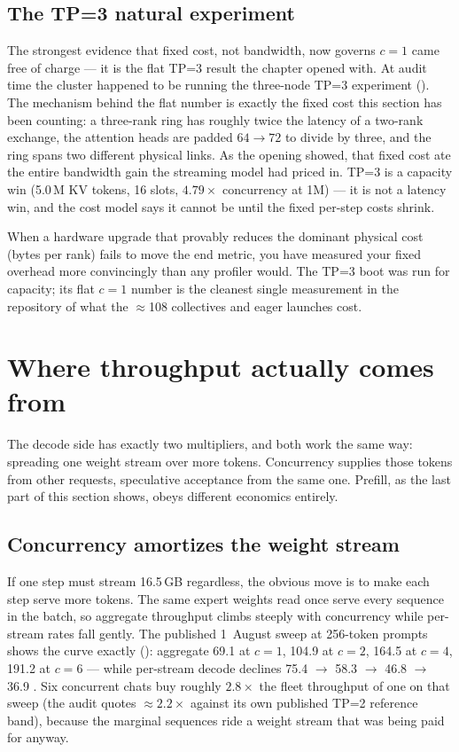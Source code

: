 \subsection{The TP=3 natural experiment}

The strongest evidence that fixed cost, not bandwidth, now governs $c=1$
came free of charge --- it is the flat TP=3 result the chapter opened with.
At audit time the cluster happened to be running the three-node TP=3
experiment (). The mechanism behind the flat number is
exactly the fixed cost this section has been counting: a three-rank ring has
roughly twice the latency of a two-rank exchange, the attention heads are
padded $64 \to 72$ to divide by three, and the ring spans two different
physical links. As the opening showed, that fixed cost ate the entire
bandwidth gain the streaming model had priced in. TP=3 is a capacity win
(5.0\,M KV tokens, 16 slots, $4.79\times$ concurrency at 1M) --- it is not a
latency win, and the cost model says it cannot be until the fixed per-step
costs shrink.

\begin{hblesson}
When a hardware upgrade that provably reduces the dominant physical cost
(bytes per rank) fails to move the end metric, you have measured your fixed
overhead more convincingly than any profiler would. The TP=3 boot was run for
capacity; its flat $c=1$ number is the cleanest single measurement in the repository
of what the $\approx$108 collectives and eager launches cost.
\end{hblesson}

\section{Where throughput actually comes from}
\label{sec:perf-throughput}

The decode side has exactly two multipliers, and both work the same way:
spreading one weight stream over more tokens. Concurrency supplies those
tokens from other requests, speculative acceptance from the same one.
Prefill, as the last part of this section shows, obeys different economics
entirely.

\subsection{Concurrency amortizes the weight stream}

If one step must stream 16.5\,GB regardless, the obvious move is to make each
step serve more tokens. The same expert weights read once serve every sequence
in the batch, so aggregate throughput climbs steeply with concurrency while
per-stream rates fall gently. The published 1~August sweep at 256-token prompts
shows the curve exactly (): aggregate 69.1 \tokspersec{} at
$c=1$, 104.9 at $c=2$, 164.5 at $c=4$, 191.2 at $c=6$ --- while per-stream
decode declines 75.4 $\to$ 58.3 $\to$ 46.8 $\to$ 36.9 \tokspersec{}. Six concurrent
chats buy roughly $2.8\times$ the fleet throughput of one on that sweep (the
audit quotes $\approx$$2.2\times$ against its own published TP=2 reference
band), because the marginal sequences ride a weight stream that was being paid
for anyway.

